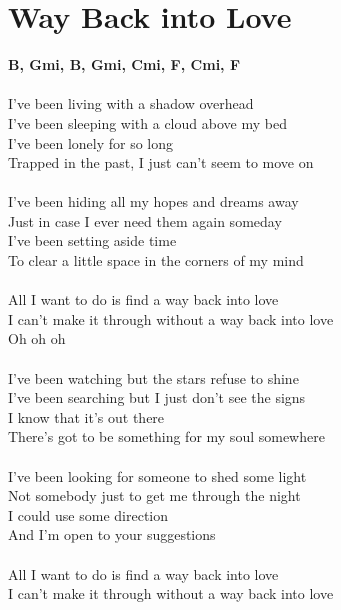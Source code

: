 \section{Way Back into Love}
\footnotesize\textbf{B\be, Gmi, B\be , Gmi, Cmi, F, Cmi, F}\\
\\
\normalsize
\color{red}
\textcolor{black}{}I've been living with a \textcolor{black}{}shadow over\textcolor{black}{}head\\
I've been sleeping with a \textcolor{black}{}cloud above my \textcolor{black}{}bed\\
I've been lonely for \textcolor{black}{}so long\\
\textcolor{black}{}Trapped in the past, I just can't \textcolor{black}{} seem to move on\\
\\
\color{blue}
I've been hiding all my hopes and dreams away\\
Just in case I ever need them again someday\\
I've been setting aside time\\
To clear a little space in the corners of my mind\\
\\
\color{black}
All I want to do is find a way back into love\\
I can't make it through without a way back into love\\
Oh oh oh\\
\\
\color{red}
I've been watching but the stars refuse to shine\\
I've been searching but I just don't see the signs\\
I know that it's out there\\
There's got to be something for my soul somewhere\\
\\
\color{blue}
I've been looking for someone to shed some light\\
Not somebody just to get me through the night\\
I could use some direction\\
And I'm open to your suggestions\\
\\
\color{black}
All I want to do is find a way back into love\\
I can't make it through without a way back into love\\
